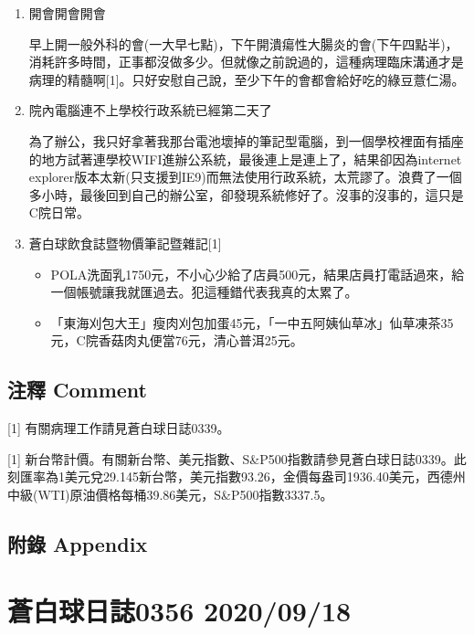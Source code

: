 \documentclass[
]{article}
\providecommand{\tightlist}{%
  \setlength{\itemsep}{0pt}\setlength{\parskip}{0pt}}
\begin{document}
\begin{enumerate}
\def\labelenumi{\arabic{enumi}.}
\item
  開會開會開會

  早上開一般外科的會(一大早七點)，下午開潰瘍性大腸炎的會(下午四點半)，消耗許多時間，正事都沒做多少。但就像之前說過的，這種病理臨床溝通才是病理的精髓啊{[}1{]}。只好安慰自己說，至少下午的會都會給好吃的綠豆薏仁湯。
\item
  院內電腦連不上學校行政系統已經第二天了

  為了辦公，我只好拿著我那台電池壞掉的筆記型電腦，到一個學校裡面有插座的地方試著連學校WIFI進辦公系統，最後連上是連上了，結果卻因為internet
  explorer版本太新(只支援到IE9)而無法使用行政系統，太荒謬了。浪費了一個多小時，最後回到自己的辦公室，卻發現系統修好了。沒事的沒事的，這只是C院日常。
\item
  蒼白球飲食誌暨物價筆記暨雜記{[}1{]}

  \begin{itemize}
  \tightlist
  \item
    POLA洗面乳1750元，不小心少給了店員500元，結果店員打電話過來，給一個帳號讓我就匯過去。犯這種錯代表我真的太累了。
  \item
    「東海刈包大王」瘦肉刈包加蛋45元，「一中五阿姨仙草冰」仙草凍茶35元，C院香菇肉丸便當76元，清心普洱25元。
  \end{itemize}
\end{enumerate}

\hypertarget{ux6ce8ux91cb-comment-16}{%
\subsection{注釋 Comment}\label{ux6ce8ux91cb-comment-16}}

{[}1{]} 有關病理工作請見蒼白球日誌0339。

{[}1{]}
新台幣計價。有關新台幣、美元指數、S\&P500指數請參見蒼白球日誌0339。此刻匯率為1美元兌29.145新台幣，美元指數93.26，金價每盎司1936.40美元，西德州中級(WTI)原油價格每桶39.86美元，S\&P500指數3337.5。

\hypertarget{ux9644ux9304-appendix-16}{%
\subsection{附錄 Appendix}\label{ux9644ux9304-appendix-16}}

\hypertarget{ux84bcux767dux7403ux65e5ux8a8c0356-20200918}{%
\section{蒼白球日誌0356
2020/09/18}\label{ux84bcux767dux7403ux65e5ux8a8c0356-20200918}}
\end{document}
